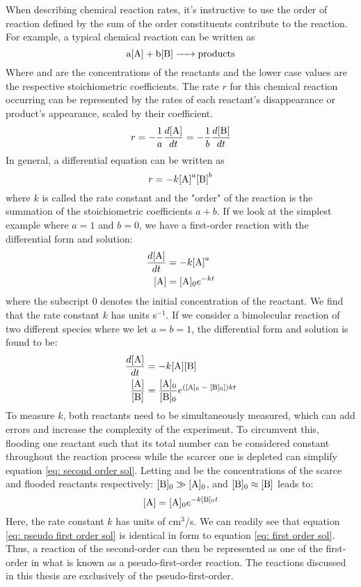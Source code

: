 When describing chemical reaction rates, it's instructive to use the order of reaction defined by the sum of the order constituents contribute to the reaction. For example, a typical chemical reaction can be written as
\begin{equation}
	\ce{a[A] + b[B] -> products}
	\label{eq: general reaction}
\end{equation}
Where \ce{[A]} and \ce{[B]} are the concentrations of the reactants and the lower case values are the respective stoichiometric coefficients. The rate $r$ for this chemical reaction occurring can be represented by the rates of each reactant's disappearance or product's appearance, scaled by their coefficient.
\begin{equation}
	r = -\frac{1}{a}\frac{d\ce{[A]}}{dt} = -\frac{1}{b}\frac{d\ce{[B]}}{dt}
\end{equation}
In general, a differential equation can be written as
\begin{equation}
	r = -k\ce{[A]}^a\ce{[B]}^b
	\label{eq: diff rate form}
\end{equation}
where $k$ is called the rate constant and the "order" of the reaction is the summation of the stoichiometric coefficients $a+b$. If we look at the simplest example where $a=1$ and $b=0$, we have a first-order reaction with the differential form and solution:
\begin{align}
	\frac{d \ce{[A]}}{dt} & = -k\ce{[A]}^a \nonumber \\
	\ce{[A]} & = \ce{[A]0}e^{-kt} \label{eq: first order sol}
\end{align}
where the subscript $0$ denotes the initial concentration of the reactant. We find that the rate constant $k$ has units s$^{-1}$. If we consider a bimolecular reaction of two different species where we let $a=b=1$, the differential form and solution is found to be:
\begin{align}
	\frac{d \ce{[A]}}{dt} & = -k \ce{[A]}\ce{[B]} \nonumber \\
	\frac{\ce{[A]}}{\ce{[B]}} & = \frac{\ce{[A]0}}{\ce{[B]0}}e^{(\ce{[A]0 - [B]0}])kt} \label{eq: second order sol}
\end{align}
To measure $k$, both reactants need to be simultaneously measured, which can add errors and increase the complexity of the experiment. To circumvent this, flooding one reactant such that its total number can be considered constant throughout the reaction process while the scarcer one is depleted can simplify equation \ref{eq: second order sol}. Letting \ce{[A]} and \ce{[B]} be the concentrations of the scarce and flooded reactants respectively: $\ce{[B]0} \gg \ce{[A]0}$, and $\ce{[B]0} \approx \ce{[B]}$ leads to:
\begin{equation}
	\ce{[A]} = \ce{[A]0}e^{-k\ce{[B]0}t} \label{eq: pseudo first order sol}
\end{equation}
Here, the rate constant $k$ has units of cm$^3$/s. We can readily see that equation \ref{eq: pseudo first order sol} is identical in form to equation \ref{eq: first order sol}. Thus, a reaction of the second-order can then be represented as one of the first-order in what is known as a pseudo-first-order reaction. The reactions discussed in this thesis are exclusively of the pseudo-first-order.